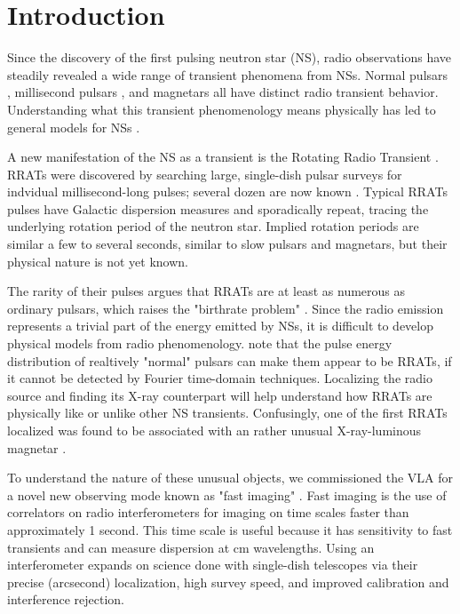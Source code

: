 \section{Introduction}

Since the discovery of the first pulsing neutron star (NS), radio observations have steadily revealed a wide range of transient phenomena from NSs. Normal pulsars \citep{HEWISH_1969}, millisecond pulsars \citep{Backer_1982}, and magnetars \citep{Camilo_2006} all have distinct radio transient behavior. Understanding what this transient phenomenology means physically has led to general models for NSs \citep{Perna_2011}.

A new manifestation of the NS as a transient is the Rotating Radio Transient \citep[RRAT;][]{McLaughlin_2006}. RRATs were discovered by searching large, single-dish pulsar surveys for indvidual millisecond-long pulses; several dozen are now known \citep{Deneva_2009, Burke_Spolaor_2010, Keane_2011}. Typical RRATs pulses have Galactic dispersion measures and sporadically repeat, tracing the underlying rotation period of the neutron star. Implied rotation periods are similar a few to several seconds, similar to slow pulsars and magnetars, but their physical nature is not yet known. 

The rarity of their pulses argues that RRATs are at least as numerous as ordinary pulsars, which raises the "birthrate problem" \citep{Keane_2011}. Since the radio emission represents a trivial part of the energy emitted by NSs, it is difficult to develop physical models from radio phenomenology. \citep{Weltevrede_2006} note that the pulse energy distribution of realtively "normal" pulsars can make them appear to be RRATs, if it cannot be detected by Fourier time-domain techniques. Localizing the radio source and finding its X-ray counterpart will help understand how RRATs are physically like or unlike other NS transients. Confusingly, one of the first RRATs localized was found to be associated with an rather unusual X-ray-luminous magnetar \citep{Lyne_2009}.

To understand the nature of these unusual objects, we commissioned the VLA for a novel new observing mode known as "fast imaging" \citep{Law_2011}. Fast imaging is the use of correlators on radio interferometers for imaging on time scales faster than approximately 1 second. This time scale is useful because it has sensitivity to fast transients and can measure dispersion at cm wavelengths. Using an interferometer expands on science done with single-dish telescopes via their precise (arcsecond) localization, high survey speed, and improved calibration and interference rejection.

